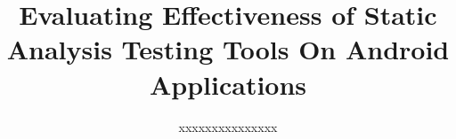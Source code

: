 \documentclass{sig-alternate}
\newif\ifisnopii
\begin{document}


\title{Evaluating Effectiveness of Static Analysis Testing Tools On Android Applications}

\ifisnopii %
\author{
%
\alignauthor
XXXXXX \\
	\affaddr{Software Engineering Department}\\
       \affaddr{Rochester Institute of Technology}\\
       \affaddr{1 Lomb Memorial Drive}\\
       \affaddr{Rochester, NY, USA} \\
       \email{\{dxkvse, XXXX\}@rit.edu}
       \alignauthor
} %

\else %
\author{
%
\alignauthor
xxxxxxxxxxxxxxx\\ 	
	\\
       \\
       \\
        \\
       \alignauthor
} %
\fi %


\maketitle
\end{document}
